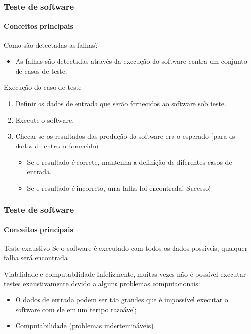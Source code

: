 \begin{frame}
\frametitle{Teste de software}
\framesubtitle{Conceitos principais}

\begin{block:fact}{Como são detectadas as falhas?}
\begin{itemize}
	\item As falhas são detectadas através da execução do software contra um conjunto de casos de teste.
\end{itemize}
\end{block:fact}

\begin{block:procedure}{Execução do caso de teste}
\begin{enumerate}
	\item Definir os dados de entrada que serão fornecidos ao software sob teste.

	\item Execute o software.

	\item Checar se os resultados das produção do software era o esperado (para os dados de entrada fornecido)
	\begin{itemize}
		\item Se o resultado é correto, mantenha a definição de diferentes casos de entrada.

		\item Se o resultado é incorreto, uma falha foi encontrada! Sucesso!
	\end{itemize}
\end{enumerate}
\end{block:procedure}
\end{frame}



\begin{frame}
\frametitle{Teste de software}
\framesubtitle{Conceitos principais}

\begin{block:principle}{Teste exaustivo}
Se o software é executado com todos os dados possíveis, qualquer falha será encontrada
\end{block:principle}

\begin{block:fact}{Viabilidade e computabilidade}
Infelizmente, muitas vezes não é possível executar testes exaustivamente devido a alguns problemas computacionais:
\begin{itemize}
	\item O dados de entrada podem ser tão grandes que é impossível executar o software com ele em um tempo razoável;

	\item Computabilidade (problemas indertemináveis).
\end{itemize}
\end{block:fact}
\end{frame}


